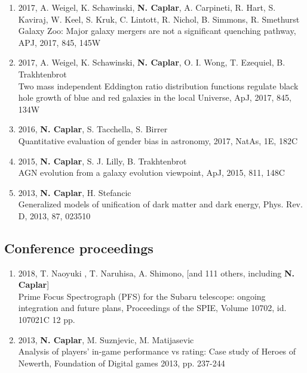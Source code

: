 \documentclass[11pt,letterpaper]{article}
\begin{document}
\begin{enumerate}
\item 2017, A. Weigel, K. Schawinski,  \textbf{N. Caplar}, A. Carpineti, R. Hart, S. Kaviraj, W. Keel, S. Kruk, C. Lintott, R. Nichol, B. Simmons, R. Smethurst
\\    Galaxy Zoo:  Major galaxy mergers are not a significant quenching pathway, APJ, 2017, 845, 145W \\

\item 2017, A. Weigel, K. Schawinski,  \textbf{N. Caplar}, O. I. Wong, T. Ezequiel, B. Trakhtenbrot
\\    Two mass independent Eddington ratio distribution functions regulate black hole growth of blue and red 
galaxies in the local Universe, ApJ, 2017, 845, 134W \\


\item 2016, \textbf{N. Caplar}, S. Tacchella, S. Birrer \\ Quantitative evaluation of gender bias in astronomy,  2017, NatAs, 1E, 182C\\
 
\item 2015,  \textbf{N. Caplar}, S. J. Lilly, B. Trakhtenbrot  \\AGN evolution from a galaxy evolution viewpoint, ApJ,  2015, 811, 148C \\
  
 \item 2013,  \textbf{N. Caplar}, H. Stefancic  \\ Generalized models of unification of dark matter and dark energy, Phys. Rev. D, 2013, 87, 023510 \\

 
\end{enumerate}
\newpage
\subsection*{Conference proceedings}
\begin{enumerate}
\item 2018, T. Naoyuki , T. Naruhisa,  A. Shimono, [and 111 others, including  \textbf{N. Caplar}] \\ Prime Focus Spectrograph (PFS) for the Subaru telescope: ongoing integration and future plans, Proceedings of the SPIE, Volume 10702, id. 107021C 12 pp. \\

\item 2013,  \textbf{N. Caplar}, M. Suznjevic, M. Matijasevic  \\ Analysis of players' in-game performance vs rating: Case study of Heroes of Newerth, Foundation of Digital games 2013,  pp. 237-244  

\end{enumerate}

\newpage 
\end{document}
